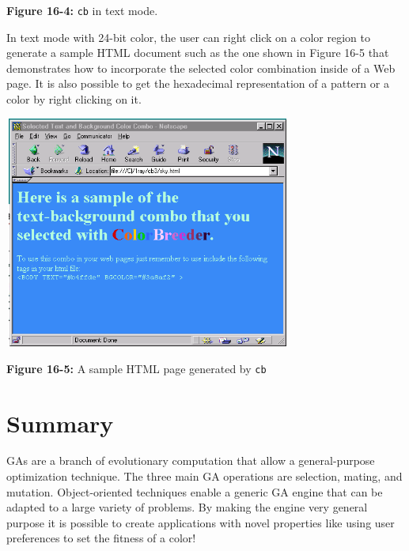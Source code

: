 {\sffamily\bfseries Figure 16-4:}
{\sffamily \texttt{cb} in text mode.}

In text mode with 24-bit color, the user can right click on a color
region to generate a sample HTML document such as the one shown in
Figure 16-5 that demonstrates how to incorporate the selected color
combination inside of a Web page. It is also possible to get the
hexadecimal representation of a pattern or a color by right clicking on
it.

\begin{center}
\includegraphics[width=3.7256in,height=3.0047in]{ub-img/ub-img49.png}
\end{center}

{\sffamily\bfseries Figure 16-5:}
{\sffamily A sample HTML page generated by \texttt{cb}}

\section*{Summary}

GAs are a branch of evolutionary computation that allow a
general-purpose optimization technique. The three main GA operations
are selection, mating, and mutation. Object-oriented techniques enable
a generic GA engine that can be adapted to a large variety of problems.
By making the engine very general purpose it is possible to create
applications with novel properties like using user preferences to set
the fitness of a color! 

